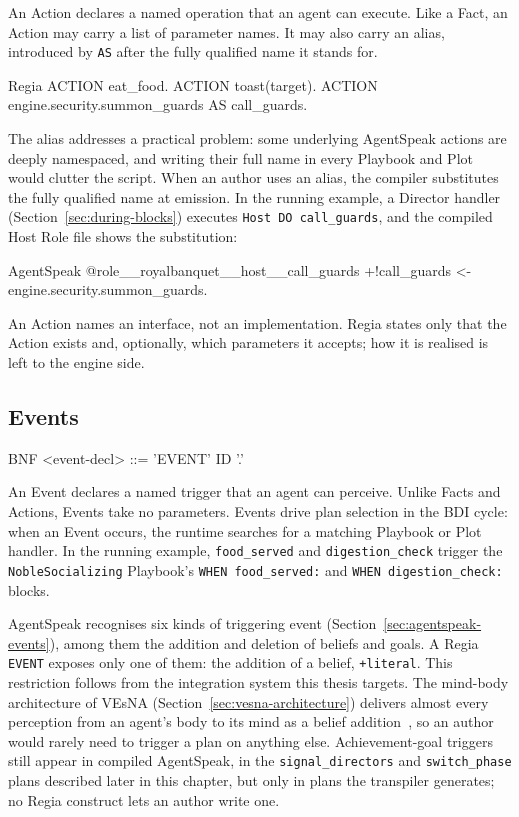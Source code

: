 An Action declares a named operation that an agent can execute. Like a Fact, an Action may carry a list of parameter names. It may also carry an alias, introduced by \lstinline|AS| after the fully qualified name it stands for.
 
\begin{codeblock}[]{Regia}
    ACTION eat_food.
    ACTION toast(target).
    ACTION engine.security.summon_guards AS call_guards.
\end{codeblock}
 
The alias addresses a practical problem: some underlying AgentSpeak actions are deeply namespaced, and writing their full name in every Playbook and Plot would clutter the script. When an author uses an alias, the compiler substitutes the fully qualified name at emission. In the running example, a Director handler (Section~\ref{sec:during-blocks}) executes \lstinline|Host DO call_guards|, and the compiled Host Role file shows the substitution:
 
\begin{codeblock}[]{AgentSpeak}
@role__royalbanquet__host__call_guards
+!call_guards <- engine.security.summon_guards.
\end{codeblock}
 
An Action names an interface, not an implementation. Regia states only that the Action exists and, optionally, which parameters it accepts; how it is realised is left to the engine side.
 
\subsection{Events}
\begin{codeblock}[]{BNF}
    <event-decl>     ::= 'EVENT' ID '.'
\end{codeblock}
 
An Event declares a named trigger that an agent can perceive. Unlike Facts and Actions, Events take no parameters. Events drive plan selection in the BDI cycle: when an Event occurs, the runtime searches for a matching Playbook or Plot handler. In the running example, \lstinline|food_served| and \lstinline|digestion_check| trigger the \lstinline|NobleSocializing| Playbook's \lstinline|WHEN food_served:| and \lstinline|WHEN digestion_check:| blocks.
 
AgentSpeak recognises six kinds of triggering event (Section~\ref{sec:agentspeak-events}), among them the addition and deletion of beliefs and goals. A Regia \lstinline|EVENT| exposes only one of them: the addition of a belief, \lstinline|+literal|. This restriction follows from the integration system this thesis targets. The mind-body architecture of VEsNA (Section~\ref{sec:vesna-architecture}) delivers almost every perception from an agent's body to its mind as a belief addition~\cite{Gatti2026}, so an author would rarely need to trigger a plan on anything else. Achievement-goal triggers still appear in compiled AgentSpeak, in the \lstinline|signal_directors| and \lstinline|switch_phase| plans described later in this chapter, but only in plans the transpiler generates; no Regia construct lets an author write one.
 
